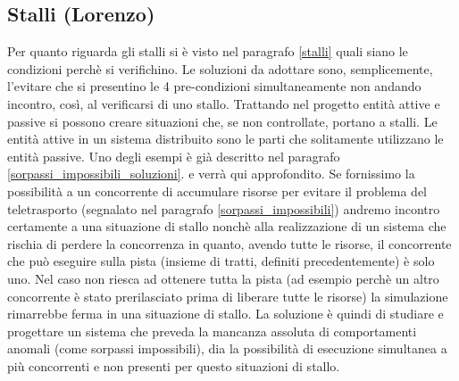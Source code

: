 \subsection{Stalli (Lorenzo)}
Per quanto riguarda gli stalli si \`{e} visto nel paragrafo \ref{stalli} quali siano le condizioni perch\`{e} si verifichino. Le soluzioni da adottare sono, semplicemente, l'evitare che si presentino le 4 pre-condizioni simultaneamente non andando incontro, cos\`{i}, al verificarsi di uno stallo.
Trattando nel progetto entit\`{a} attive e passive si possono creare situazioni che, se non controllate, portano a stalli. Le entit\`{a} attive in un sistema distribuito sono le parti che solitamente utilizzano le entit\`{a} passive. Uno degli esempi \`{e} gi\`{a} descritto nel paragrafo \ref{sorpassi_impossibili_soluzioni}. e verr\`{a} qui approfondito. Se fornissimo la possibilit\`{a} a un concorrente  di accumulare risorse per evitare il problema del teletrasporto (segnalato nel paragrafo \ref{sorpassi_impossibili}) andremo incontro certamente a una situazione di stallo nonch\`{e} alla realizzazione di un sistema che rischia di perdere la concorrenza in quanto, avendo tutte le risorse, il concorrente che pu\`{o} eseguire sulla pista (insieme di tratti, definiti precedentemente) \`{e} solo uno. Nel caso non riesca ad ottenere tutta la pista (ad esempio perch\`{e} un altro concorrente \`{e} stato prerilasciato prima di liberare tutte le risorse) la simulazione rimarrebbe ferma in una situazione di stallo. La soluzione \`{e} quindi di studiare e progettare un sistema che preveda la mancanza assoluta di comportamenti anomali (come sorpassi impossibili), dia la possibilit\`{a} di esecuzione simultanea a pi\`{u} concorrenti e non presenti per questo situazioni di stallo.
